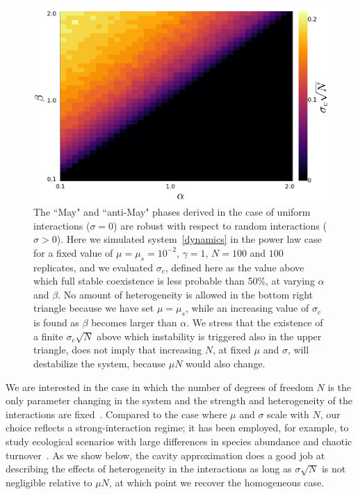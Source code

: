 \documentclass[
 pre,
 twocolumn,
 amsmath,
 amssymb,
 aps,
]{revtex4-2}
\begin{document}
\begin{figure}[t!]
    \includegraphics[width=.45\textwidth]{alpha-beta.pdf}
    \caption{The ``May" and ``anti-May" phases derived in the
    case of uniform interactions ($\sigma = 0$) are robust with respect to random interactions ($\sigma > 0$).
    Here we simulated system~\eqref{dynamics} in the power law case for a fixed value of
    $\mu=\mu_s=10^{-2}$, $\gamma=1$, $N=100$ and $100$ replicates,  
    and we evaluated $\sigma_c$, defined here as
    the value above which full stable coexistence is less probable than 50\%,
    at varying $\alpha$ and $\beta$.
    No amount of heterogeneity is allowed in the bottom right triangle because we have set $\mu=\mu_s$, while an increasing value of $\sigma_c$
    is found as $\beta$ becomes larger than $\alpha$.
    We stress that the existence of a finite $\sigma_c\sqrt{N}$ above which instability is triggered also in the upper triangle,
    does not imply that increasing $N$, at fixed $\mu$ and $\sigma$, will destabilize the system, because $\mu N$ would also change.
    }
    \label{fig: alpha-beta}
\end{figure}
We are interested in the case in which the number of degrees of freedom $N$ is the only parameter changing in the system and the strength and heterogeneity of the interactions are fixed~\cite{kessler2015generalized,fried2016communities}. Compared to the case where $\mu$ and $\sigma$ scale with $N$, our choice reflects a strong-interaction regime; it has been employed, for example, to study ecological scenarios with large differences in species abundance and chaotic turnover~\cite{mallmin2024chaotic}. As we show below, the cavity approximation does a good job at describing the effects of heterogeneity in the interactions as long as $\sigma \sqrt{N}$ is not negligible relative to $\mu N$, at which point we recover the homogeneous case.
\end{document}
